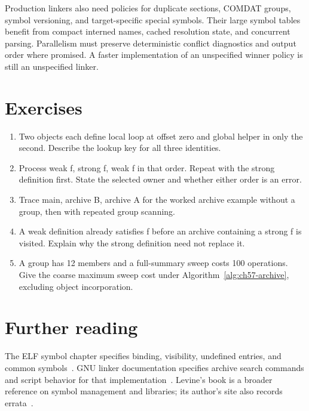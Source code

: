 Production linkers also need policies for duplicate sections, COMDAT groups, symbol versioning, and target-specific special symbols.
Their large symbol tables benefit from compact interned names, cached resolution state, and concurrent parsing.
Parallelism must preserve deterministic conflict diagnostics and output order where promised.
A faster implementation of an unspecified winner policy is still an unspecified linker.

\section{Exercises}
\label{sec:ch57-exercises}
\begin{enumerate}
\item\label{ex:ch57-local} Two objects each define local loop at offset zero and global helper in only the second. Describe the lookup key for all three identities.
\item\label{ex:ch57-weak} Process weak f, strong f, weak f in that order. Repeat with the strong definition first. State the selected owner and whether either order is an error.
\item\label{ex:ch57-group} Trace main, archive B, archive A for the worked archive example without a group, then with repeated group scanning.
\item\label{ex:ch57-extraction} A weak definition already satisfies f before an archive containing a strong f is visited. Explain why the strong definition need not replace it.
\item\label{ex:ch57-complexity} A group has 12 members and a full-summary sweep costs 100 operations. Give the coarse maximum sweep cost under Algorithm~\ref{alg:ch57-archive}, excluding object incorporation.
\end{enumerate}

\section{Further reading}
\label{sec:ch57-reading}
The ELF symbol chapter specifies binding, visibility, undefined entries, and common symbols~\cite{xinuos-2026-elf}.
GNU linker documentation specifies archive search commands and script behavior for that implementation~\cite{gnu-2026-ld}.
Levine's book is a broader reference on symbol management and libraries; its author's site also records errata~\cite{levine-1999-linkers}.
